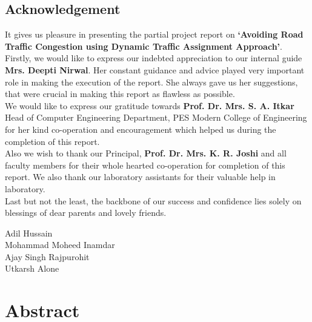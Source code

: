 \documentclass[12pt,a4paper,final]{report}
\begin{document}
\thispagestyle{empty}
\Large
\begin{center}
\chapter*{\centering Acknowledgement}
\end{center}
\normalsize
It gives us pleasure in presenting the partial project report on \textbf{`Avoiding Road Traffic Congestion using Dynamic Traffic Assignment Approach'}.\\

Firstly, we would like to express our indebted appreciation to our internal guide \textbf{Mrs. Deepti Nirwal}. Her constant guidance and advice played very important role in making the execution of the report. She always gave us her suggestions, that were crucial in making this report as flawless as possible.\\

We would like to express our gratitude towards \textbf{Prof. Dr. Mrs. S. A. Itkar} Head of Computer Engineering Department, PES Modern College of Engineering for her kind co-operation and encouragement which helped us during the completion of this report.\\

Also we wish to thank our Principal, \textbf{Prof. Dr. Mrs. K. R. Joshi} and all faculty members for their whole hearted co-operation for completion of this report. We also thank our laboratory assistants for their valuable help in laboratory. \\

Last but not the least, the backbone of our success and confidence lies solely on blessings of dear parents and lovely friends.

\begin{flushright}
Adil Hussain\\
Mohammad Moheed Inamdar\\
Ajay Singh Rajpurohit\\
Utkarsh Alone\\
\end{flushright}


\pagestyle{plain} 
\cleardoublepage
{}
\tableofcontents
\newpage

\Large
\chapter*{\centering Abstract}
\normalsize
\noindent
\end{document}
